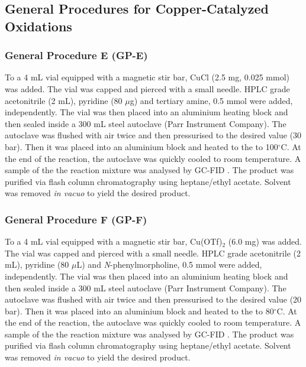 \subsection{General Procedures for Copper-Catalyzed Oxidations}

\subsubsection{General Procedure E (GP-E)}

\label{ss:GPE}

To a 4 mL vial equipped with a magnetic stir bar, CuCl (2.5 mg, 0.025 mmol) was added. The vial was capped and pierced with a small needle. HPLC grade acetonitrile (2 mL), pyridine (80 $\mu$g) and tertiary amine, 0.5 mmol were added, independently. The vial was then placed into an aluminium heating block and then sealed inside a 300 mL steel autoclave (Parr Instrument Company). The autoclave was flushed with air twice and then pressurised to the desired value (30 bar). Then it was placed into an aluminium block and heated to the to 100$^{\circ}$C. At the end of the reaction, the autoclave was quickly cooled to room temperature. A sample of the the reaction mixture was analysed by GC-FID . The product was purified via flash column chromatography using heptane/ethyl acetate. Solvent was removed \textit{in vacuo} to yield the desired product.

\subsubsection{General Procedure F (GP-F)}

\label{ss:GPF}

To a 4 mL vial equipped with a magnetic stir bar, Cu(OTf)$_2$ (6.0 mg) was added. The vial was capped and pierced with a small needle. HPLC grade acetonitrile (2 mL), pyridine (80 $\mu$L) and \textit{N}-phenylmorpholine, 0.5 mmol were added, independently. The vial was then placed into an aluminium heating block and then sealed inside a 300 mL steel autoclave (Parr Instrument Company). The autoclave was flushed with air twice and then pressurised to the desired value (20 bar). Then it was placed into an aluminium block and heated to the to 80$^{\circ}$C. At the end of the reaction, the autoclave was quickly cooled to room temperature. A sample of the the reaction mixture was analysed by GC-FID . The product was purified via flash column chromatography using heptane/ethyl acetate. Solvent was removed \textit{in vacuo} to yield the desired product.

